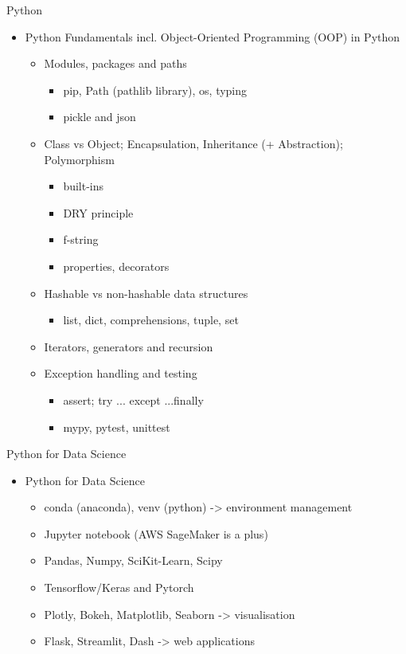 \documentclass[compress,brown]{beamer}
\begin{document}
\begin{frame}{Python}
	\begin{itemize}
		\item Python Fundamentals incl. Object-Oriented Programming (OOP) in Python
		\begin{itemize}
			\item Modules, packages and paths
			\begin{itemize}
				\item pip, Path (pathlib library), os, typing
				\item pickle and json
			\end{itemize} 		
			\item Class vs Object; Encapsulation, Inheritance (+ Abstraction); Polymorphism
			\begin{itemize}
				\item built-ins
				\item DRY principle
				\item f-string
				\item properties, decorators
			\end{itemize} 
			\item Hashable vs non-hashable data structures
			\begin{itemize}
				\item list, dict, comprehensions, tuple, set 
			\end{itemize}
			\item Iterators, generators and recursion
			\item Exception handling and testing
			\begin{itemize}
				\item assert; try ... except ...finally
				\item mypy, pytest, unittest
			\end{itemize}		
		\end{itemize}
	\end{itemize}
\end{frame}

\begin{frame}{Python for Data Science}
	\begin{itemize}
		\item Python for Data Science
		\begin{itemize}
			\item conda (anaconda), venv (python) -> environment management
			\item Jupyter notebook (AWS SageMaker is a plus)
			\item Pandas, Numpy, SciKit-Learn, Scipy
			\item Tensorflow/Keras and Pytorch 
			\item Plotly, Bokeh, Matplotlib, Seaborn -> visualisation
			\item Flask, Streamlit, Dash -> web applications
		\end{itemize}
	\end{itemize}
\end{frame}
\end{document}
